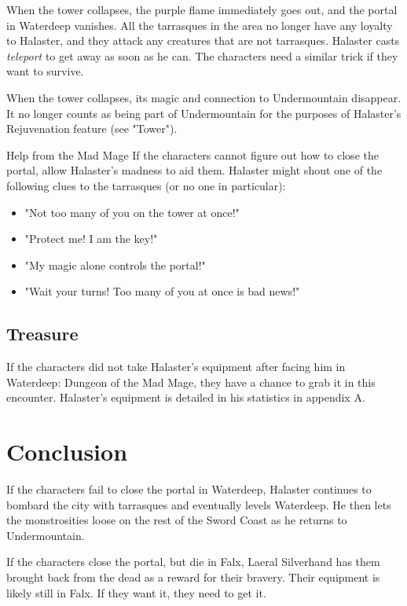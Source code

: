 \documentclass[10pt,a4paper,twoside,bg=print,twocolumn,openany,nodeprecatedcode]{dndbook}
\begin{document}
When the tower collapses, the purple flame immediately goes out, and the portal in Waterdeep vanishes. All the tarrasques in the area no longer have any loyalty to Halaster, and they attack any creatures that are not tarrasques. Halaster casts \textit{teleport} to get away as soon as he can. The characters need a similar trick if they want to survive.

When the tower collapses, its magic and connection to Undermountain disappear. It no longer counts as being part of Undermountain for the purposes of Halaster's Rejuvenation feature (see  "Tower").

\begin{DndSidebar}[float=!b]{Help from the Mad Mage}
If the characters cannot figure out how to close the portal, allow Halaster's madness to aid them. Halaster might shout one of the following clues to the tarrasques (or no one in  particular):




\begin{itemize}
\item "Not too many of you on the tower at once!"
\item "Protect me! I am the key!"
\item "My magic alone controls the portal!"
\item "Wait your turns! Too many of you at once is bad news!"
\end{itemize}



\end{DndSidebar}

\subsection{Treasure}
If the characters did not take Halaster's equipment after facing him in Waterdeep: Dungeon of the Mad Mage, they have a chance to grab it in this encounter. Halaster's equipment is detailed in his statistics in appendix A.

\section{Conclusion}
If the characters fail to close the portal in Waterdeep, Halaster continues to bombard the city with tarrasques and eventually levels Waterdeep. He then lets the monstrosities loose on the rest of the Sword Coast as he returns to Undermountain.

If the characters close the portal, but die in Falx, Laeral Silverhand has them brought back from the dead as a reward for their bravery. Their equipment is likely still in Falx. If they want it, they need to get it.
\end{document}
